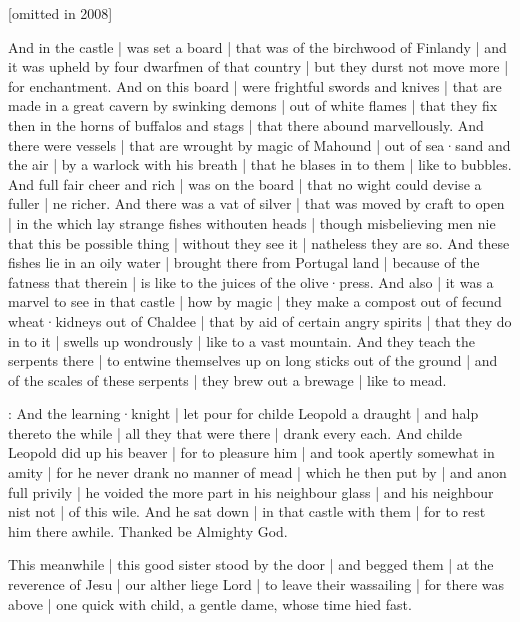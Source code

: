 
[omitted in 2008]

And in the castle |
was set a board |
that was of the birchwood of Finlandy |
and it was upheld by four dwarfmen of that country |
but they durst not move more |
for enchantment.
And on this board |
were frightful swords and knives |
that are made in a great cavern by swinking demons |
out of white flames |
that they fix then in the horns of buffalos and stags |
that there abound marvellously.
And there were vessels |
that are wrought by magic of Mahound |
out of sea·sand and the air |
by a warlock with his breath |
that he blases in to them |
like to bubbles.
And full fair cheer and rich |
was on the board |
that no wight could devise a fuller |
ne richer.
And there was a vat of silver |
that was moved by craft to open |
in the which lay strange fishes withouten heads |
though misbelieving men nie that this be possible thing |
without they see it |
natheless they are so.
And these fishes lie in an oily water |
brought there from Portugal land |
because of the fatness that therein |
is like to the juices of the olive·press.
And also |
it was a marvel to see in that castle |
how by magic |
they make a compost out of fecund wheat·kidneys out of Chaldee |
that by aid of certain angry spirits |
that they do in to it |
swells up wondrously |
like to a vast mountain.
And they teach the serpents there |
to entwine themselves up on long sticks out of the ground |
and of the scales of these serpents |
they brew out a brewage |
like to mead.


:
And the learning·knight |
let pour for childe Leopold a draught |
and halp thereto the while |
all they that were there |
drank every each.
And childe Leopold did up his beaver |
for to pleasure him |
and took apertly somewhat in amity |
for he never drank no manner of mead |
which he then put by |
and anon full privily |
he voided the more part in his neighbour glass |
and his neighbour nist not |
of this wile.
And he sat down |
in that castle with them |
for to rest him there awhile.
Thanked be Almighty God.



This meanwhile |
this good sister stood by the door |
and begged them |
at the reverence of Jesu |
our alther liege Lord |
to leave their wassailing |
for there was above |
one quick with child,
a gentle dame,
whose time hied fast.

